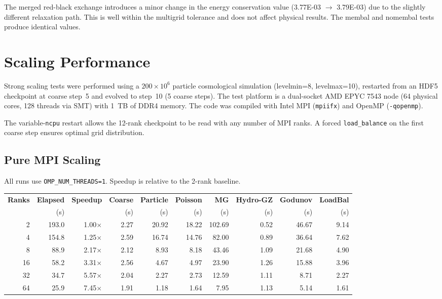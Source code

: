 \documentclass[11pt,fleqn]{book}
\begin{document}
\begin{infobox}
The merged red-black exchange introduces a minor change in the energy conservation value (3.77E-03 $\to$ 3.79E-03) due to the slightly different relaxation path. This is well within the multigrid tolerance and does not affect physical results. The membal and nomembal tests produce identical values.
\end{infobox}


\chapter{Scaling Performance}
\label{ch:scaling}

Strong scaling tests were performed using a $200 \times 10^6$ particle cosmological simulation (levelmin=8, levelmax=10), restarted from an HDF5 checkpoint at coarse step~5 and evolved to step~10 (5 coarse steps). The test platform is a dual-socket AMD EPYC 7543 node (64 physical cores, 128 threads via SMT) with 1~TB of DDR4 memory. The code was compiled with Intel MPI (\texttt{mpiifx}) and OpenMP (\texttt{-qopenmp}).

The variable-\texttt{ncpu} restart allows the 12-rank checkpoint to be read with any number of MPI ranks. A forced \texttt{load\_balance} on the first coarse step ensures optimal grid distribution.

\section{Pure MPI Scaling}

All runs use \texttt{OMP\_NUM\_THREADS=1}.  Speedup is relative to the 2-rank baseline.

\begin{center}
\begin{tabular}{rrrrrrrrrr}
\toprule
\textbf{Ranks} & \textbf{Elapsed} & \textbf{Speedup} & \textbf{Coarse} & \textbf{Particle} & \textbf{Poisson} & \textbf{MG} & \textbf{Hydro-GZ} & \textbf{Godunov} & \textbf{LoadBal} \\
 & (s) & & (s) & (s) & (s) & (s) & (s) & (s) & (s) \\
\midrule
2   & 193.0 & 1.00$\times$ & 2.27 & 20.92 & 18.22 & 102.69 & 0.52 & 46.67 & 9.14 \\
4   & 154.8 & 1.25$\times$ & 2.59 & 16.74 & 14.76 & 82.00  & 0.89 & 36.64 & 7.62 \\
8   &  88.9 & 2.17$\times$ & 2.12 &  8.93 &  8.18 & 43.46  & 1.09 & 21.68 & 4.90 \\
16  &  58.2 & 3.31$\times$ & 2.56 &  4.67 &  4.97 & 23.90  & 1.26 & 15.88 & 3.96 \\
32  &  34.7 & 5.57$\times$ & 2.04 &  2.27 &  2.73 & 12.59  & 1.11 &  8.71 & 2.27 \\
64  &  25.9 & 7.45$\times$ & 1.91 &  1.18 &  1.64 &  7.95  & 1.13 &  5.14 & 1.61 \\
\bottomrule
\end{tabular}
\end{center}
\end{document}
